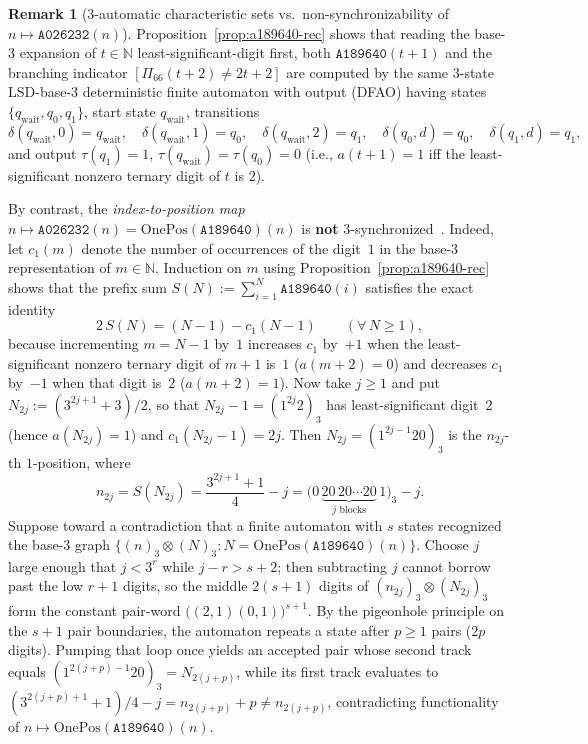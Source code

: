 \documentclass[11pt]{article}
\theoremstyle{definition}
\newtheorem{remark}[theorem]{Remark}
\newcommand{\N}{\mathbb{N}}
\newcommand{\seq}[1]{\texttt{#1}}
\newcommand{\OnePos}{\mathrm{OnePos}}
\begin{document}
\begin{remark}[3-automatic characteristic sets vs.\ non-synchronizability of $n \mapsto \seq{A026232}(n)$]
\label{rem:automata}
Proposition~\ref{prop:a189640-rec} shows that reading the base-$3$ expansion of $t \in \N$ least-significant-digit first, both $\seq{A189640}(t + 1)$ and the branching indicator $[\Pi_{66}(t + 2) \ne 2t + 2]$ are computed by the same $3$-state LSD-base-$3$ deterministic finite automaton with output (DFAO) having states $\{q_{\mathrm{wait}}, q_0, q_1\}$, start state $q_{\mathrm{wait}}$, transitions
\[
\delta(q_{\mathrm{wait}}, 0) = q_{\mathrm{wait}}, \quad \delta(q_{\mathrm{wait}}, 1) = q_0, \quad \delta(q_{\mathrm{wait}}, 2) = q_1, \quad \delta(q_0, d) = q_0, \quad \delta(q_1, d) = q_1,
\]
and output $\tau(q_1) = 1$, $\tau(q_{\mathrm{wait}}) = \tau(q_0) = 0$ (i.e., $a(t + 1) = 1$ iff the least-significant nonzero ternary digit of $t$ is $2$).

By contrast, the \emph{index-to-position map} $n \mapsto \seq{A026232}(n) = \OnePos(\seq{A189640})(n)$ is \textbf{not} $3$-synchronized~\cite{allouche2003}. Indeed, let $c_1(m)$ denote the number of occurrences of the digit~$1$ in the base-$3$ representation of $m \in \N$. Induction on $m$ using Proposition~\ref{prop:a189640-rec} shows that the prefix sum $S(N) := \sum_{i=1}^N \seq{A189640}(i)$ satisfies the exact identity
\[
2\,S(N) = (N - 1) - c_1(N - 1) \qquad (\forall\, N \ge 1),
\]
because incrementing $m = N - 1$ by~$1$ increases $c_1$ by~$+1$ when the least-significant nonzero ternary digit of $m + 1$ is~$1$ ($a(m + 2) = 0$) and decreases $c_1$ by~$-1$ when that digit is~$2$ ($a(m + 2) = 1$). Now take $j \ge 1$ and put $N_{2j} := (3^{2j+1} + 3)/2$, so that $N_{2j} - 1 = (1^{2j}2)_3$ has least-significant digit~$2$ (hence $a(N_{2j}) = 1$) and $c_1(N_{2j} - 1) = 2j$. Then $N_{2j} = (1^{2j-1}20)_3$ is the $n_{2j}$-th $1$-position, where
\[
n_{2j} = S(N_{2j}) = \frac{3^{2j+1} + 1}{4} - j = \bigl(0\,\underbrace{20\,20\cdots 20}_{j\text{ blocks}}\,1\bigr)_3 - j.
\]
Suppose toward a contradiction that a finite automaton with $s$ states recognized the base-$3$ graph $\{(n)_3 \otimes (N)_3 : N = \OnePos(\seq{A189640})(n)\}$. Choose $j$ large enough that $j < 3^r$ while $j - r > s + 2$; then subtracting $j$ cannot borrow past the low $r + 1$ digits, so the middle $2(s+1)$ digits of $(n_{2j})_3 \otimes (N_{2j})_3$ form the constant pair-word $\bigl((2,1)(0,1)\bigr)^{s+1}$. By the pigeonhole principle on the $s + 1$ pair boundaries, the automaton repeats a state after $p \ge 1$ pairs ($2p$ digits). Pumping that loop once yields an accepted pair whose second track equals $(1^{2(j+p)-1}20)_3 = N_{2(j+p)}$, while its first track evaluates to $(3^{2(j+p)+1} + 1)/4 - j = n_{2(j+p)} + p \ne n_{2(j+p)}$, contradicting functionality of $n \mapsto \OnePos(\seq{A189640})(n)$.


\end{remark}
\end{document}
